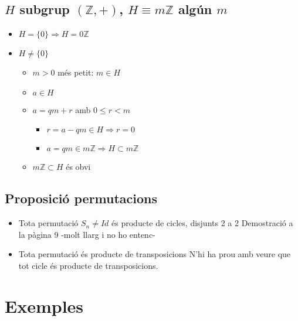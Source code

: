 \documentclass{article}
\newcommand{\Z}{\mathbb{Z}}
\begin{document}
\subsection{$H$ subgrup $(\Z, +)$, $H \equiv m\Z$ algún $m$}
\begin{itemize}
\item $H = \{0\} \Rightarrow H = 0 \Z$
\item $H \neq \{0\}$
	\begin{itemize}
	\item $m > 0$ més petit: $m \in H$
	\item $a \in H$
	\item $a = qm + r$ amb $0 \le r < m$
		\begin{itemize}
		\item $r = a - qm \in H \Rightarrow r = 0$
		\item $a = qm \in m\Z \Rightarrow H \subset m\Z$
		\end{itemize}
	\item $m\Z \subset H$ és obvi
	\end{itemize}
\end{itemize}
\subsection{Proposició permutacions}
\begin{itemize}
\item Tota permutació $S_n \neq Id$ és producte de cicles, disjunts 2 a 2
	\subitem Demostració a la pàgina 9 -molt llarg i no ho entenc-
\item Tota permutació és producte de transposicions
	\subitem N'hi ha prou amb veure que tot cicle és producte de transposicions.
\end{itemize}

\newpage\section{Exemples}
\end{document}
